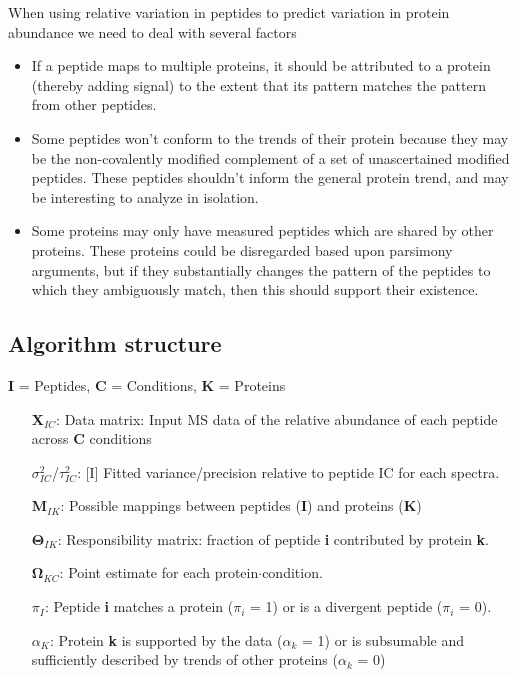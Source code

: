 \documentclass[12pt]{article}
\begin{document}
When using relative variation in peptides to predict variation in protein abundance we need to deal with several factors
\begin{itemize}
\item If a peptide maps to multiple proteins, it should be attributed to a protein (thereby adding signal) to the extent that its pattern matches the pattern from other peptides.
\item Some peptides won't conform to the trends of their protein because they may be the non-covalently modified complement of a set of unascertained modified peptides. These peptides shouldn't inform the general protein trend, and may be interesting to analyze in isolation.
\item Some proteins may only have measured peptides which are shared by other proteins. These proteins could be disregarded based upon parsimony arguments, but if they substantially changes the pattern of the peptides to which they ambiguously match, then this should support their existence.
\end{itemize}

\subsection*{Algorithm structure}

\textbf{I} = Peptides, \textbf{C} = Conditions, \textbf{K} = Proteins

\begin{itemize}
\item[\textbf{X}$_{IC}$:] Data matrix: Input MS data of the relative abundance of each peptide across \textbf{C} conditions
\item[$\sigma^{2}_{IC}$/$\tau^{2}_{IC}$:] [I] Fitted variance/precision relative to peptide IC for each spectra.
\item[\textbf{M}$_{IK}$:] Possible mappings between peptides (\textbf{I}) and proteins (\textbf{K})
\item[$\mathbf{\Theta}_{IK}$:] Responsibility matrix: fraction of peptide \textbf{i} contributed by protein \textbf{k}.
\item[$\mathbf{\Omega}_{KC}$:] Point estimate for each protein$\cdot$condition.
\item[$\pi_{I}$:] Peptide \textbf{i} matches a protein ($\pi_{i}$ = 1) or is a divergent peptide ($\pi_{i}$ = 0).
\item[$\alpha_{K}$:] Protein \textbf{k} is supported by the data ($\alpha_k$ = 1) or is subsumable and sufficiently described by trends of other proteins ($\alpha_{k}$ = 0)

\end{itemize}
\end{document}
